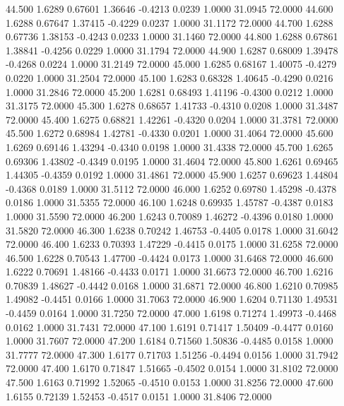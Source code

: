   44.500   1.6289   0.67601   1.36646  -0.4213   0.0239   1.0000  31.0945  72.0000
  44.600   1.6288   0.67647   1.37415  -0.4229   0.0237   1.0000  31.1172  72.0000
  44.700   1.6288   0.67736   1.38153  -0.4243   0.0233   1.0000  31.1460  72.0000
  44.800   1.6288   0.67861   1.38841  -0.4256   0.0229   1.0000  31.1794  72.0000
  44.900   1.6287   0.68009   1.39478  -0.4268   0.0224   1.0000  31.2149  72.0000
  45.000   1.6285   0.68167   1.40075  -0.4279   0.0220   1.0000  31.2504  72.0000
  45.100   1.6283   0.68328   1.40645  -0.4290   0.0216   1.0000  31.2846  72.0000
  45.200   1.6281   0.68493   1.41196  -0.4300   0.0212   1.0000  31.3175  72.0000
  45.300   1.6278   0.68657   1.41733  -0.4310   0.0208   1.0000  31.3487  72.0000
  45.400   1.6275   0.68821   1.42261  -0.4320   0.0204   1.0000  31.3781  72.0000
  45.500   1.6272   0.68984   1.42781  -0.4330   0.0201   1.0000  31.4064  72.0000
  45.600   1.6269   0.69146   1.43294  -0.4340   0.0198   1.0000  31.4338  72.0000
  45.700   1.6265   0.69306   1.43802  -0.4349   0.0195   1.0000  31.4604  72.0000
  45.800   1.6261   0.69465   1.44305  -0.4359   0.0192   1.0000  31.4861  72.0000
  45.900   1.6257   0.69623   1.44804  -0.4368   0.0189   1.0000  31.5112  72.0000
  46.000   1.6252   0.69780   1.45298  -0.4378   0.0186   1.0000  31.5355  72.0000
  46.100   1.6248   0.69935   1.45787  -0.4387   0.0183   1.0000  31.5590  72.0000
  46.200   1.6243   0.70089   1.46272  -0.4396   0.0180   1.0000  31.5820  72.0000
  46.300   1.6238   0.70242   1.46753  -0.4405   0.0178   1.0000  31.6042  72.0000
  46.400   1.6233   0.70393   1.47229  -0.4415   0.0175   1.0000  31.6258  72.0000
  46.500   1.6228   0.70543   1.47700  -0.4424   0.0173   1.0000  31.6468  72.0000
  46.600   1.6222   0.70691   1.48166  -0.4433   0.0171   1.0000  31.6673  72.0000
  46.700   1.6216   0.70839   1.48627  -0.4442   0.0168   1.0000  31.6871  72.0000
  46.800   1.6210   0.70985   1.49082  -0.4451   0.0166   1.0000  31.7063  72.0000
  46.900   1.6204   0.71130   1.49531  -0.4459   0.0164   1.0000  31.7250  72.0000
  47.000   1.6198   0.71274   1.49973  -0.4468   0.0162   1.0000  31.7431  72.0000
  47.100   1.6191   0.71417   1.50409  -0.4477   0.0160   1.0000  31.7607  72.0000
  47.200   1.6184   0.71560   1.50836  -0.4485   0.0158   1.0000  31.7777  72.0000
  47.300   1.6177   0.71703   1.51256  -0.4494   0.0156   1.0000  31.7942  72.0000
  47.400   1.6170   0.71847   1.51665  -0.4502   0.0154   1.0000  31.8102  72.0000
  47.500   1.6163   0.71992   1.52065  -0.4510   0.0153   1.0000  31.8256  72.0000
  47.600   1.6155   0.72139   1.52453  -0.4517   0.0151   1.0000  31.8406  72.0000
